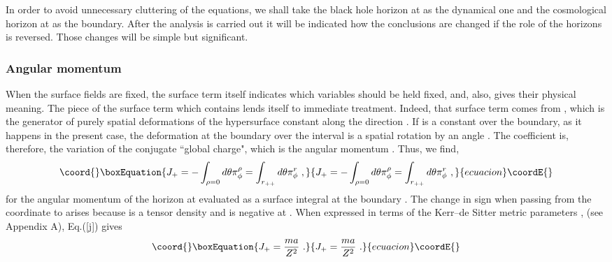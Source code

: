 \documentclass[a4paper,preprintnumbers,amsmath,amssymb]{revtex4}
\begin{document}
In order to avoid unnecessary cluttering of the equations, we shall take
the black hole horizon at \coordHE{} as the dynamical one and the cosmological horizon at
\coordHE{} as the boundary. After the analysis is carried out it will be indicated
how the conclusions are changed if the role of the horizons is reversed. Those changes
will be simple but significant.

\subsubsection*{Angular momentum}
When the surface fields are fixed, the surface term itself indicates which
variables should be held fixed, and, also, gives their physical meaning.
The piece of the surface term which contains \coordHE{} lends itself to immediate
treatment. Indeed, that surface term comes from \coordHE{}, which is the generator
of purely spatial deformations of the hypersurface \coordHE{}constant along the direction \myHighlight{$\phi$}\coordHE{}. If
\coordHE{} is a constant over the boundary, as it happens in the present case, the deformation at the boundary
over the interval \coordHE{} is a spatial rotation by an angle
\coordHE{}.
The coefficient is, therefore, the variation of the conjugate ``global charge", which is the angular momentum \coordHE{}.
Thus, we find,
\begin{equation}\coord{}\boxEquation{
J_+ = -\int_{\rho=0} d\theta \pi^{\rho}_{\phi} =
\int_{r_{++}} d\theta \pi^{r}_{\phi} \ ,
\label{j}
}{
J_+ = -\int_{\rho=0} d\theta \pi^{\rho}_{\phi} =
\int_{r_{++}} d\theta \pi^{r}_{\phi} \ ,
}{ecuacion}\coordE{}\end{equation}
for the angular momentum of the horizon at \coordHE{} evaluated as a surface integral
at the boundary \coordHE{}. The change in sign when passing from
the coordinate \myHighlight{$\rho$}\coordHE{} to \coordHE{} arises because \coordHE{} is a tensor
density and \coordHE{} is negative at \coordHE{}.
When expressed in terms of the Kerr--de Sitter metric
parameters \coordHE{}, \coordHE{} (see Appendix A), Eq.(\ref{j}) gives
\begin{equation}\coord{}\boxEquation{
J_+ = \frac{ma}{Z^2} \ .
\label{jkerr}
}{
J_+ = \frac{ma}{Z^2} \ .
}{ecuacion}\coordE{}\end{equation}
\end{document}
